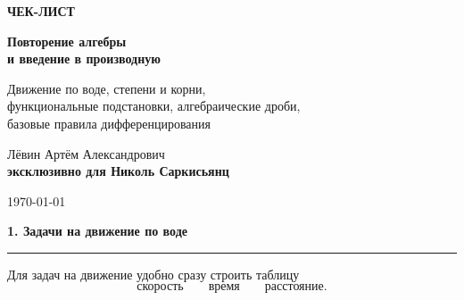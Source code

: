\documentclass[a4paper,12pt]{article}
\newcommand{\lessonsection}[1]{%
    \vspace{0.5em}
    {\Large\bfseries\color{darkaccent}#1}\par
    \vspace{0.2em}
    {\color{accent}\rule{\linewidth}{0.6pt}}
    \vspace{0.5em}
}
\begin{document}

\begin{titlepage}
\thispagestyle{empty}

\begin{center}

\vspace*{2.4cm}

{\Large\color{accent}\textbf{ЧЕК-ЛИСТ}}

\vspace{0.7cm}

{\Huge\bfseries
Повторение алгебры\\[0.2cm]
и введение в производную}

\vspace{1.2cm}

{\large
Движение по воде, степени и корни,\\
функциональные подстановки, алгебраические дроби,\\
базовые правила дифференцирования}

\vfill

{\large
Лёвин Артём Александрович\\[0.15cm]
\textbf{эксклюзивно для Николь Саркисьянц}
}

\vspace{0.5cm}

{\large \today}

\vspace{1.6cm}


\vspace{0.8cm}

\end{center}
\end{titlepage}


\lessonsection{1. Задачи на движение по воде}

Для задач на движение удобно сразу строить таблицу
\[
\text{скорость}\qquad \text{время}\qquad \text{расстояние}.
\]
\end{document}
